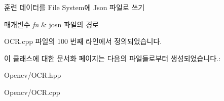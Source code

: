 훈련 데이터를 File System에 Json 파일로 쓰기 


\begin{DoxyParams}{매개변수}
{\em fn} & josn 파일의 경로 \\
\hline
\end{DoxyParams}


O\+C\+R.\+cpp 파일의 100 번째 라인에서 정의되었습니다.



이 클래스에 대한 문서화 페이지는 다음의 파일들로부터 생성되었습니다.\+:\begin{DoxyCompactItemize}
\item 
Opencv/O\+C\+R.\+hpp\item 
Opencv/O\+C\+R.\+cpp\end{DoxyCompactItemize}
